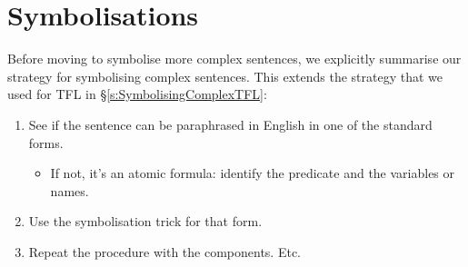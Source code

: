 %
%
%


\section{Symbolisations}
\label{s:SymbolisingComplexFOL}
Before moving to symbolise more complex sentences, we explicitly summarise our strategy for symbolising complex sentences. This extends the strategy that we used for TFL in \S\ref{s:SymbolisingComplexTFL}:

\begin{highlighted}
\begin{enumerate}
\item See if the sentence can be paraphrased in English in one of the standard forms.
	\begin{itemize}
	\item If not, it's an atomic formula: identify the predicate and the variables or names.
	\end{itemize}
\item Use the symbolisation trick for that form.
\item Repeat the procedure with the components. Etc.
\end{enumerate}
\end{highlighted}

